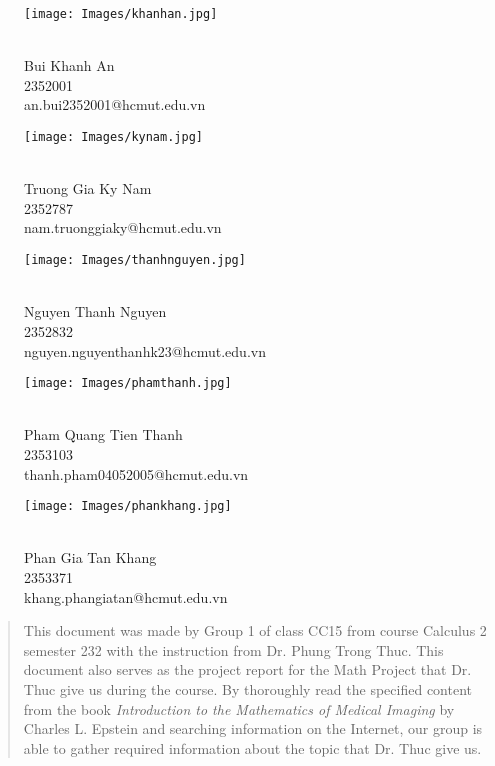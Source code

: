 \documentclass[a4paper]{article}
\begin{document}
\newpage
\thispagestyle{empty}
\setcounter{page}{-2}
\begin{figure}[!htb]
    \begin{minipage}{0.48\textwidth}
      \centering
      \texttt{[image: Images/khanhan.jpg]}
      \caption*{\\ Bui Khanh An \\ 2352001 \\ an.bui2352001@hcmut.edu.vn}
    \end{minipage}
    \begin{minipage}{0.48\textwidth}
      \centering
      \texttt{[image: Images/kynam.jpg]}
      \caption*{\\ \centering Truong Gia Ky Nam \\ 2352787 \\ nam.truonggiaky@hcmut.edu.vn}
    \end{minipage}
\end{figure}
\begin{figure}[!htb]
    \begin{minipage}{0.48\textwidth}
      \centering
      \texttt{[image: Images/thanhnguyen.jpg]}
      \caption*{\\ \centering Nguyen Thanh Nguyen \\ 2352832 \\ nguyen.nguyenthanhk23@hcmut.edu.vn}
    \end{minipage}
    \begin{minipage}{0.48\textwidth}
      \centering
      \texttt{[image: Images/phamthanh.jpg]}
      \caption*{\\ \centering Pham Quang Tien Thanh \\ 2353103 \\ thanh.pham04052005@hcmut.edu.vn}
    \end{minipage}
\end{figure}
\begin{figure}[!htb]
    \centering
    \texttt{[image: Images/phankhang.jpg]}
    \caption*{\\ Phan Gia Tan Khang \\ 2353371 \\ khang.phangiatan@hcmut.edu.vn}
\end{figure}
\newpage

\newpage
\thispagestyle{empty}
\tableofcontents
\newpage

\newpage
\thispagestyle{empty}
\begin{abstract}
    \noindent This document was made by Group 1 of class CC15 from course Calculus 2 semester 232 with the instruction from Dr. Phung Trong Thuc. This document also serves as the project report for the Math Project that Dr. Thuc give us during the course. By thoroughly read the specified content from the book \textit{Introduction to the Mathematics of Medical Imaging} by Charles L. Epstein and searching information on the Internet, our group is able to gather required information about the topic that Dr. Thuc give us.  
\end{abstract}
\newpage
\end{document}
